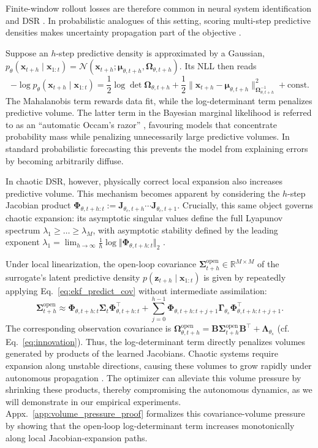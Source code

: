 \documentclass{article}
\theoremstyle{plain}
\theoremstyle{definition}
\theoremstyle{remark}
\begin{document}
Finite-window rollout losses are therefore common in neural system identification and DSR \citep{hess2023generalized, forgione2021continuoustime,beintema2021nonlinear,beintema2023deep}. In probabilistic analogues of this setting, scoring multi-step predictive densities makes uncertainty propagation part of the objective \citep{girard2002multiplestep,doerr2018probabilistic}.

Suppose an $h$-step predictive density is approximated by a Gaussian, $p_\theta(\bm x_{t+h}\mid \bm x_{1:t})=\mathcal N(\bm x_{t+h};\bm\mu_{\theta,t+h},\bm\Omega_{\theta,t+h})$. Its NLL then reads
\[-\log p_\theta(\bm x_{t+h}\mid \bm x_{1:t}) = \frac12\log\det\bm\Omega_{\theta,t+h}+\frac12\|\bm x_{t+h}-\bm\mu_{\theta,t+h}\|^2_{\bm\Omega_{\theta,t+h}^{-1}} + \mathrm{const}.
\]
The Mahalanobis term rewards data fit, while the log-determinant term penalizes predictive volume. The latter term in the Bayesian marginal likelihood is referred to as an ``automatic Occam’s razor'' \citep{rasmussen2006gaussian,mackay1992bayesian}, favouring models that concentrate probability mass while penalizing unnecessarily large predictive volumes. In standard probabilistic forecasting this prevents the model from explaining 
errors by becoming arbitrarily diffuse. 

In chaotic DSR, however, physically correct local expansion also increases predictive volume. This mechanism becomes apparent 
by considering the $h$-step Jacobian product  $\bm\Phi_{\theta,t+h:t} := \bm J_{\theta_c,t+h}\cdots \bm J_{\theta_c,t+1}$. Crucially, this same object governs chaotic expansion: its asymptotic singular values define the full Lyapunov spectrum $\lambda_1 \geq \dots \geq \lambda_M$, with asymptotic stability defined by the leading exponent $\lambda_1 = \lim_{h\to\infty} \tfrac1h \log \Vert \bm\Phi_{\theta,t+h:t} \Vert_2$ \citep{eckmann1985ergodic}.

Under local linearization, the open-loop covariance $\bm\Sigma^{\mathrm{open}}_{t+h} \in \mathbb{R}^{M \times M}$ of the surrogate's latent predictive density $p(\bm{z}_{t+h}\mid \bm{x}_{1:t})$ is given by repeatedly applying Eq.~\ref{eq:ekf_predict_cov} without intermediate assimilation:
\[
\bm\Sigma^{\mathrm{open}}_{t+h} \approx \bm\Phi_{\theta,t+h:t}\bm\Sigma_t\bm\Phi_{\theta,t+h:t}^{\top} + \sum_{j=0}^{h-1}\bm\Phi_{\theta,t+h:t+j+1}\bm\Gamma_{\theta_s}\bm\Phi_{\theta,t+h:t+j+1}^{\top}.
\]
The corresponding observation covariance is $\bm\Omega^{\mathrm{open}}_{\theta,t+h} = \bm B\bm\Sigma^{\mathrm{open}}_{t+h}\bm B^\top + \bm\Lambda_{\theta_s}$ (cf. Eq.~\ref{eq:innovation}). Thus, the log-determinant term directly penalizes volumes generated by products of the learned Jacobians. Chaotic systems require expansion along unstable directions, causing these volumes to grow rapidly under autonomous propagation \citep{trevisan2011kalman,carrassi2022data}.
The optimizer can alleviate this volume pressure by shrinking these products, thereby compromising the autonomous dynamics, as we will demonstrate in our empirical experiments. Appx.~\ref{app:volume_pressure_proof} formalizes this covariance-volume pressure by showing that the open-loop log-determinant term increases monotonically along local Jacobian-expansion paths.
\end{document}
